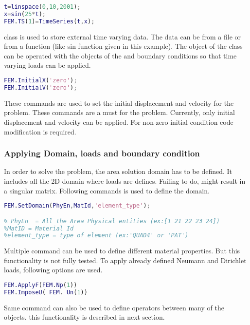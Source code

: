 \documentclass[main.tex]{subfiles}
\begin{document}
\begin{lstlisting}[language=matlab]
t=linspace(0,10,2001);
x=sin(25*t);    
FEM.TS(1)=TimeSeries(t,x);
\end{lstlisting}
 class is used to store external time varying data. The data can be from a file or from a function (like sin function given in this example). The object  of the class  can be operated with the objects of the  and  boundary conditions so that time varying loads can be applied. 

\begin{lstlisting}[language=matlab]
FEM.InitialX('zero');
FEM.InitialV('zero');
\end{lstlisting}
These commands are used to set the initial displacement and velocity for the  problem. These commands are a must for the  problem. Currently, only  initial displacement and velocity can be applied. For non-zero initial condition code modification is required.

\subsubsection{Applying Domain, loads and boundary condition}

In order to solve the problem, the area solution domain has to be defined. It includes all the 2D domain where loads are defines. Failing to do, might result in a singular matrix. Following commands is used to define the domain.
\begin{lstlisting}[language=matlab]
FEM.SetDomain(PhyEn,MatId,'element_type');

% PhyEn  = All the Area Physical entities (ex:[1 21 22 23 24])
%MatID = Material Id 
%element_type = type of element (ex:'QUAD4' or 'PAT')
\end{lstlisting}

Multiple  command can be used to define different material properties. But this functionality is not fully tested. To apply already defined Neumann and Dirichlet loads, following options are used.

 \begin{lstlisting}[language=matlab]
FEM.ApplyF(FEM.Np(1))
FEM.ImposeU( FEM. Un(1))
\end{lstlisting}

Same command can also be used to define operators between many of the objects. this functionality is described in next section. 
\end{document}
